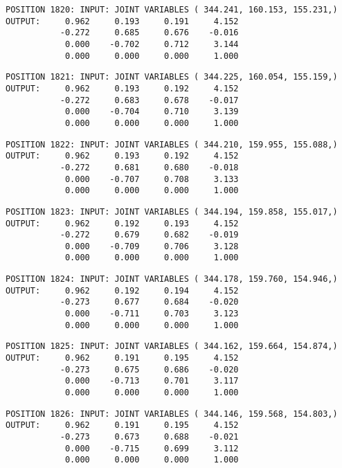 \begin{verbatim}
POSITION 1820: INPUT: JOINT VARIABLES ( 344.241, 160.153, 155.231,)
OUTPUT:     0.962     0.193     0.191     4.152
           -0.272     0.685     0.676    -0.016
            0.000    -0.702     0.712     3.144
            0.000     0.000     0.000     1.000
\end{verbatim} \pagebreak[1]\begin{verbatim}
POSITION 1821: INPUT: JOINT VARIABLES ( 344.225, 160.054, 155.159,)
OUTPUT:     0.962     0.193     0.192     4.152
           -0.272     0.683     0.678    -0.017
            0.000    -0.704     0.710     3.139
            0.000     0.000     0.000     1.000
\end{verbatim} \pagebreak[1]\begin{verbatim}
POSITION 1822: INPUT: JOINT VARIABLES ( 344.210, 159.955, 155.088,)
OUTPUT:     0.962     0.193     0.192     4.152
           -0.272     0.681     0.680    -0.018
            0.000    -0.707     0.708     3.133
            0.000     0.000     0.000     1.000
\end{verbatim} \pagebreak[1]\begin{verbatim}
POSITION 1823: INPUT: JOINT VARIABLES ( 344.194, 159.858, 155.017,)
OUTPUT:     0.962     0.192     0.193     4.152
           -0.272     0.679     0.682    -0.019
            0.000    -0.709     0.706     3.128
            0.000     0.000     0.000     1.000
\end{verbatim} \pagebreak[1]\begin{verbatim}
POSITION 1824: INPUT: JOINT VARIABLES ( 344.178, 159.760, 154.946,)
OUTPUT:     0.962     0.192     0.194     4.152
           -0.273     0.677     0.684    -0.020
            0.000    -0.711     0.703     3.123
            0.000     0.000     0.000     1.000
\end{verbatim} \pagebreak[1]\begin{verbatim}
POSITION 1825: INPUT: JOINT VARIABLES ( 344.162, 159.664, 154.874,)
OUTPUT:     0.962     0.191     0.195     4.152
           -0.273     0.675     0.686    -0.020
            0.000    -0.713     0.701     3.117
            0.000     0.000     0.000     1.000
\end{verbatim} \pagebreak[1]\begin{verbatim}
POSITION 1826: INPUT: JOINT VARIABLES ( 344.146, 159.568, 154.803,)
OUTPUT:     0.962     0.191     0.195     4.152
           -0.273     0.673     0.688    -0.021
            0.000    -0.715     0.699     3.112
            0.000     0.000     0.000     1.000
\end{verbatim} \pagebreak[1]\begin{verbatim}

\end{verbatim}
